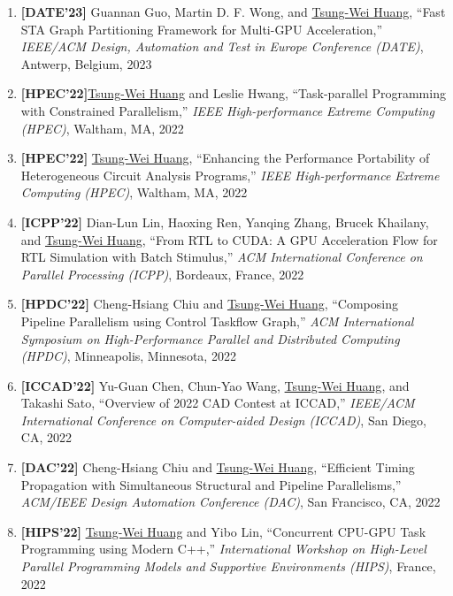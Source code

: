 \documentclass[A4,11pt]{article}
\begin{document}
\begin{enumerate}
    \item \textbf{[DATE'23]} Guannan Guo, Martin D. F. Wong, and \underline{Tsung-Wei Huang}, ``Fast STA Graph Partitioning Framework for Multi-GPU Acceleration,'' \textit{IEEE/ACM Design, Automation and Test in Europe Conference (DATE)}, Antwerp, Belgium, 2023
    \item \textbf{[HPEC'22]}\underline{Tsung-Wei Huang} and Leslie Hwang, ``Task-parallel Programming with Constrained Parallelism,'' \textit{IEEE High-performance Extreme Computing (HPEC)}, Waltham, MA, 2022

    \item \textbf{[HPEC'22]} \underline{Tsung-Wei Huang}, ``Enhancing the Performance Portability of Heterogeneous Circuit Analysis Programs,'' \textit{IEEE High-performance Extreme Computing (HPEC)}, Waltham, MA, 2022

    \item \textbf{[ICPP'22]} Dian-Lun Lin, Haoxing Ren, Yanqing Zhang, Brucek Khailany, and \underline{Tsung-Wei Huang}, ``From RTL to CUDA: A GPU Acceleration Flow for RTL Simulation with Batch Stimulus,'' \textit{ACM International Conference on Parallel Processing (ICPP)}, Bordeaux, France, 2022

    \item \textbf{[HPDC'22]} Cheng-Hsiang Chiu and \underline{Tsung-Wei Huang}, ``Composing Pipeline Parallelism using Control Taskflow Graph,'' \textit{ACM International Symposium on High-Performance Parallel and Distributed Computing (HPDC)}, Minneapolis, Minnesota, 2022

    \item \textbf{[ICCAD'22]} Yu-Guan Chen, Chun-Yao Wang, \underline{Tsung-Wei Huang}, and Takashi Sato, ``Overview of 2022 CAD Contest at ICCAD,'' \textit{IEEE/ACM International Conference on Computer-aided Design (ICCAD)}, San Diego, CA, 2022

    \item \textbf{[DAC'22]} Cheng-Hsiang Chiu and \underline{Tsung-Wei Huang}, ``Efficient Timing Propagation with Simultaneous Structural and Pipeline Parallelisms,'' \textit{ACM/IEEE Design Automation Conference (DAC)}, San Francisco, CA, 2022 

    \item \textbf{[HIPS'22]} \underline{Tsung-Wei Huang} and Yibo Lin, ``Concurrent CPU-GPU Task Programming using Modern C++,'' \textit{International Workshop on High-Level Parallel Programming Models and Supportive Environments (HIPS)}, France, 2022


\end{enumerate}
\end{document}
